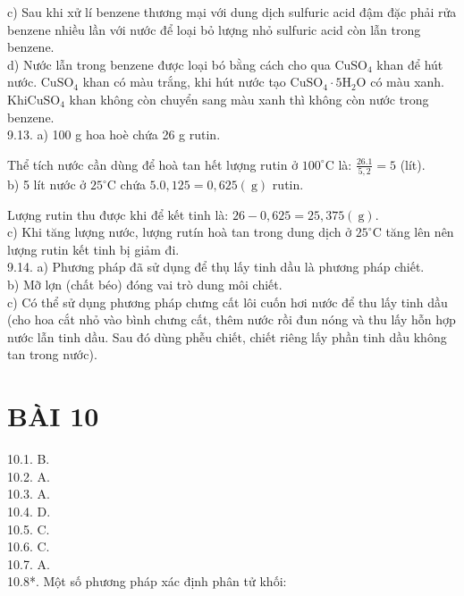 \documentclass[10pt]{article}
\begin{document}
\begin{itemize}
c) Sau khi xử lí benzene thương mại với dung dịch sulfuric acid đậm đặc phải rửa benzene nhiều lần với nước để loại bỏ lượng nhỏ sulfuric acid còn lẫn trong benzene.\\
d) Nước lẫn trong benzene được loại bó bằng cách cho qua $\mathrm{CuSO}_{4}$ khan để hút nước. $\mathrm{CuSO}_{4}$ khan có màu trắng, khi hút nước tạo $\mathrm{CuSO}_{4} \cdot 5 \mathrm{H}_{2} \mathrm{O}$ có màu xanh. $\mathrm{Khi} \mathrm{CuSO}_{4}$ khan không còn chuyển sang màu xanh thì không còn nước trong benzene.\\
9.13. a) 100 g hoa hoè chứa 26 g rutin.
\end{itemize}

Thể tích nước cần dùng để hoà tan hết lượng rutin ở $100^{\circ} \mathrm{C}$ là: $\frac{26.1}{5,2}=5$ (lít).\\
b) 5 lít nước ở $25^{\circ} \mathrm{C}$ chứa $5.0,125=0,625(\mathrm{~g})$ rutin.

Lượng rutin thu được khi để kết tinh là: $26-0,625=25,375(\mathrm{~g})$.\\
c) Khi tăng lượng nước, lượng rutín hoà tan trong dung dịch ở $25^{\circ} \mathrm{C}$ tăng lên nên lượng rutin kết tinh bị giảm đi.\\
9.14. a) Phương pháp đã sử dụng để thụ lấy tinh dầu là phương pháp chiết.\\
b) Mỡ lợn (chất béo) đóng vai trò dung môi chiết.\\
c) Có thể sử dụng phương pháp chưng cất lôi cuốn hơi nước để thu lấy tinh dầu (cho hoa cắt nhỏ vào bình chưng cất, thêm nước rồi đun nóng và thu lấy hỗn hợp nước lẫn tinh dầu. Sau đó dùng phễu chiết, chiết riêng lấy phần tinh dầu không tan trong nước).

\section*{BÀI 10}
10.1. B.\\
10.2. A.\\
10.3. A.\\
10.4. D.\\
10.5. C.\\
10.6. C.\\
10.7. A.\\
10.8*. Một số phương pháp xác định phân tử khối:
\end{document}
